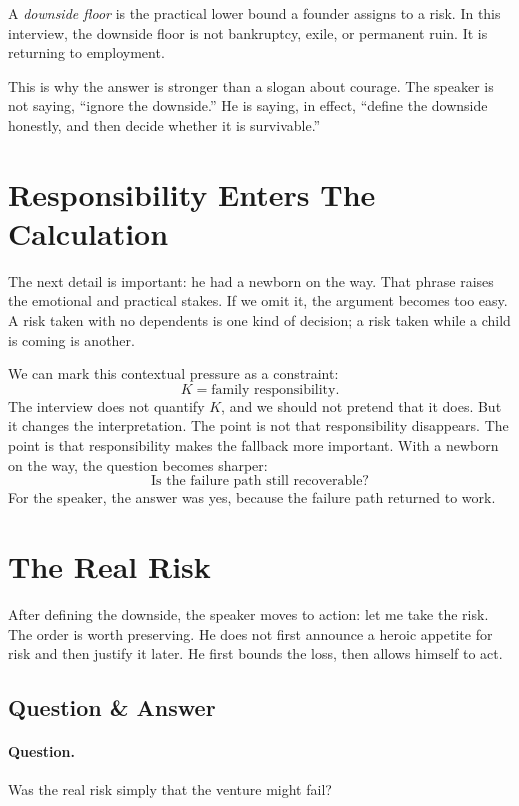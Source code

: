 \begin{definition}
A \emph{downside floor} is the practical lower bound a founder assigns to a risk. In this interview, the downside floor is not bankruptcy, exile, or permanent ruin. It is returning to employment.
\end{definition}

This is why the answer is stronger than a slogan about courage. The speaker is not saying, ``ignore the downside.'' He is saying, in effect, ``define the downside honestly, and then decide whether it is survivable.''

\section{Responsibility Enters The Calculation}

The next detail is important: he had a newborn on the way. That phrase raises the emotional and practical stakes. If we omit it, the argument becomes too easy. A risk taken with no dependents is one kind of decision; a risk taken while a child is coming is another.

We can mark this contextual pressure as a constraint:
\begin{equation}
K = \text{family responsibility}.
\end{equation}
The interview does not quantify \(K\), and we should not pretend that it does. But it changes the interpretation. The point is not that responsibility disappears. The point is that responsibility makes the fallback more important. With a newborn on the way, the question becomes sharper:
\[
\text{Is the failure path still recoverable?}
\]
For the speaker, the answer was yes, because the failure path returned to work.

\section{The Real Risk}

After defining the downside, the speaker moves to action: let me take the risk. The order is worth preserving. He does not first announce a heroic appetite for risk and then justify it later. He first bounds the loss, then allows himself to act.

\subsection{Question \& Answer}

\paragraph{Question.}
Was the real risk simply that the venture might fail?

